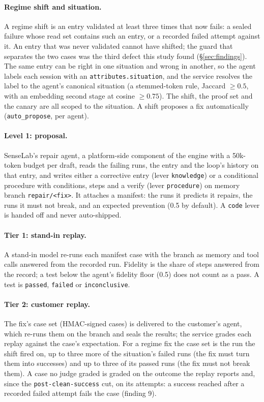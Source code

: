 \documentclass[11pt]{article}
\newcommand{\code}[1]{\texttt{#1}}
\begin{document}
\paragraph{Regime shift and situation.} A regime shift is an entry validated at least three times
that now fails: a sealed failure whose read set contains such an entry, or a recorded failed
attempt against it. An entry that was never validated cannot have shifted; the guard that
separates the two cases was the third defect this study found (\S\ref{sec:findings}). The same
entry can be right in one situation and wrong in another, so the agent labels each session with
an \code{attributes.situation}, and the service resolves the label to the agent's canonical
situation (a stemmed-token rule, Jaccard $\geq 0.5$, with an embedding second stage at cosine
$\geq 0.75$). The shift, the proof set and the canary are all scoped to the situation. A shift
proposes a fix automatically (\code{auto\_propose}, per agent).

\paragraph{Level 1: proposal.} SenseLab's repair agent, a platform-side component of the engine
with a 50k-token budget per draft, reads the failing runs, the entry and the loop's history on that entry, and writes either a corrective
entry (lever \code{knowledge}) or a conditional procedure with conditions, steps and a verify
(lever \code{procedure}) on memory branch \code{repair/<fix>}. It attaches a manifest: the runs it
predicts it repairs, the runs it must not break, and an expected prevention (0.5 by default). A
\code{code} lever is handed off and never auto-shipped.

\paragraph{Tier 1: stand-in replay.} A stand-in model re-runs each manifest case with the branch
as memory and tool calls answered from the recorded run. Fidelity is the share of steps answered
from the record; a test below the agent's fidelity floor (0.5) does not count as a pass. A test
is \code{passed}, \code{failed} or \code{inconclusive}.

\paragraph{Tier 2: customer replay.} The fix's case set (HMAC-signed cases) is delivered to the
customer's agent, which re-runs them on the branch and seals the results; the service grades each
replay against the case's expectation. For a regime fix the case set is the run the shift fired
on, up to three more of the situation's failed runs (the fix must turn them into successes) and
up to three of its passed runs (the fix must not break them). A case no judge graded is graded on
the outcome the replay reports and, since the \code{post-clean-success} cut, on its attempts: a
success reached after a recorded failed attempt fails the case (finding 9).
\end{document}
